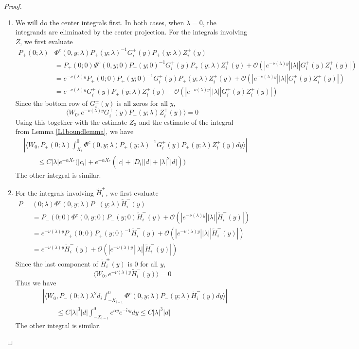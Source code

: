 \documentclass[thesis.tex]{subfiles}
\begin{document}
\begin{lemma}
\begin{proof}
\begin{enumerate}
\item We will do the center integrals first. In both cases, when $\lambda = 0$, the integrands are eliminated by the center projection. For the integrals involving $Z$, we first evaluate
\begin{align*}
P_+(0; \lambda) &\Phi^c(0, y; \lambda) P_+(y; \lambda)^{-1} G_i^+(y) P_+(y; \lambda) Z_i^+(y) \\
&= P_+(0; 0) \Phi^c(0, y; 0) P_+(y; 0)^{-1} G_i^+(y) P_+(y; \lambda) Z_i^+(y) + \mathcal{O}(|e^{-\nu(\lambda) y}||\lambda||G_i^+(y) Z_i^+(y)|) \\
&= e^{-\nu(\lambda) y} P_+(0; 0) P_+(y; 0)^{-1} G_i^+(y) P_+(y; \lambda) Z_i^+(y) + \mathcal{O}(|e^{-\nu(\lambda) y}||\lambda||G_i^+(y) Z_i^+(y)|) \\
&= e^{-\nu(\lambda) y} G_i^+(y) P_+(y; \lambda) Z_i^+(y) + \mathcal{O}(|e^{-\nu(\lambda) y}||\lambda||G_i^+(y) Z_i^+(y)|)
\end{align*}
Since the bottom row of $G_i^\pm(y)$ is all zeros for all $y$, 
\[
\langle W_0, e^{-\nu(\lambda) y} G_i^+(y) P_+(y; \lambda) Z_i^+(y) \rangle = 0
\]
Using this together with the estimate $Z_3$ and the estimate of the integral from Lemma \ref{L1boundlemma}, we have
\begin{align*}
&\left| \langle W_0, P_+(0; \lambda) \int_{X_i}^0 \Phi^c(0, y; \lambda) P_+(y; \lambda)^{-1} G_i^+(y) P_+(y; \lambda) Z_i^+(y) dy \rangle \right| \\
&\qquad \leq C |\lambda| e^{-\alpha X_*}\Big(|c_i| + e^{-\alpha X_*}\left(|c| + |D_i||d| + |\lambda|^2|d|\right) \Big)
\end{align*}
The other integral is similar.

\item For the integrals involving $\tilde{H}_i^\pm$, we first evaluate
\begin{align*}
P_-&(0; \lambda) \Phi^c(0, y; \lambda) P_-(y; \lambda) \tilde{H}_i^-(y) \\
&= P_-(0; 0) \Phi^c(0, y; 0) P_-(y; 0) \tilde{H}_i^-(y) + \mathcal{O}(|e^{-\nu(\lambda) y}||\lambda||\tilde{H}_i^-(y)|) \\
&= e^{-\nu(\lambda) y} P_+(0; 0) P_+(y; 0)^{-1}\tilde{H}_i^-(y) + \mathcal{O}(|e^{-\nu(\lambda) y}||\lambda||\tilde{H}_i^-(y)|)  \\
&= e^{-\nu(\lambda) y} \tilde{H}_i^-(y) + \mathcal{O}(|e^{-\nu(\lambda) y}||\lambda||\tilde{H}_i^-(y)|) 
\end{align*}
Since the last component of $\tilde{H}_i^\pm(y)$ is 0 for all $y$,
\[
\langle W_0, e^{-\nu(\lambda) y} \tilde{H}_i^-(y) \rangle = 0
\]
Thus we have
\begin{align*}
&\left| \langle W_0, P_-(0; \lambda) \lambda^2 d_i \int_{-X_{i-1}}^0 \Phi^c(0, y; \lambda) P_-(y; \lambda) \tilde{H}_i^-(y) dy \rangle \right| \\
&\qquad \leq C |\lambda|^3 |d| \int_{-X_{i-1}}^0 e^{\alpha y} e^{-\tilde{\alpha} y} dy \leq C |\lambda|^3 |d| 
\end{align*}
The other integral is similar.


\end{enumerate}
\end{proof}
\end{lemma}
\end{document}
